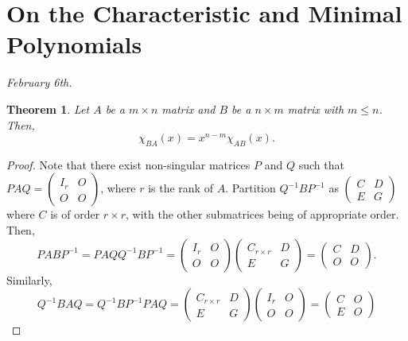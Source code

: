 \documentclass[15pt,a4paper]{book}
\newtheorem{theorem}{Theorem}[chapter]
\theoremstyle{definition}
\begin{document}
\section{On the Characteristic and Minimal Polynomials}
\textit{February 6th.}
\begin{theorem}
    Let $A$ be a $m \times n$ matrix and $B$ be a $n \times m$ matrix with $m \leq n$. Then,
    \begin{equation}
        \chi_{BA}(x) = x^{n-m} \chi_{AB}(x).
    \end{equation}
\end{theorem}
\begin{proof}
    Note that there exist non-singular matrices $P$ and $Q$ such that $PAQ = \begin{pmatrix}
        I_{r} & O \\ O & O
    \end{pmatrix}$, where $r$ is the rank of $A$. Partition $Q^{-1}BP^{-1}$ as $\begin{pmatrix}
        C & D \\ E & G
    \end{pmatrix}$ where $C$ is of order $r \times r$, with the other submatrices being of appropriate order. Then,
    \begin{equation}
        PABP^{-1} = PAQQ^{-1}BP^{-1} = \begin{pmatrix}
            I_{r} & O \\ O & O
        \end{pmatrix} \begin{pmatrix}
            C_{r \times r} & D \\ E & G
        \end{pmatrix} = \begin{pmatrix}
            C & D \\ O & O
        \end{pmatrix}.
    \end{equation}
    Similarly,
    \begin{equation}
        Q^{-1}BAQ = Q^{-1}BP^{-1}PAQ = \begin{pmatrix}
            C_{r \times r} & D \\ E & G
        \end{pmatrix} \begin{pmatrix}
            I_{r} & O \\ O & O
        \end{pmatrix} = \begin{pmatrix}
            C & O \\ E & O

\end{pmatrix}
\end{equation}
\end{proof}
\end{document}
